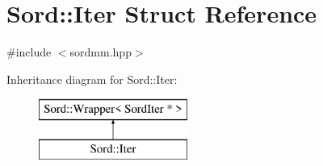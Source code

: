 \hypertarget{struct_sord_1_1_iter}{}\section{Sord\+:\+:Iter Struct Reference}
\label{struct_sord_1_1_iter}


{\ttfamily \#include $<$sordmm.\+hpp$>$}

Inheritance diagram for Sord\+:\+:Iter\+:\begin{figure}[H]
\begin{center}
\leavevmode
\includegraphics[height=2.000000cm]{struct_sord_1_1_iter}
\end{center}
\end{figure}

